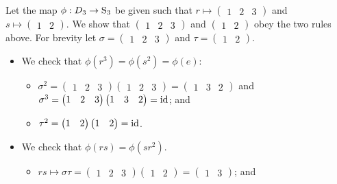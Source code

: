 \begin{enumerate}
    Let the map $\phi: D_3 \to \mathrm{S}_{3}$ be given such that $r \mapsto \begin{pmatrix}1 & 2 & 3\end{pmatrix}$ and $s \mapsto \begin{pmatrix}1 & 2\end{pmatrix}$. We show that $\begin{pmatrix}1 & 2 & 3\end{pmatrix}$ and $\begin{pmatrix}1 & 2\end{pmatrix}$ obey the two rules above. For brevity let $\sigma = \begin{pmatrix}1 & 2 & 3\end{pmatrix}$ and $\tau = \begin{pmatrix}1 & 2\end{pmatrix}$.
    \begin{itemize}
        \item We check that $\phi(r^3) = \phi(s^2) = \phi(e)$:
        \begin{itemize}
            \item $\sigma^2 = \begin{pmatrix}1 & 2 & 3\end{pmatrix}\begin{pmatrix}1 & 2 & 3\end{pmatrix} = \begin{pmatrix}1 & 3 & 2\end{pmatrix}$ and $\sigma^3 = \begin{pmatrix}1 & 2 & 3\end{pmatrix}\begin{pmatrix}1 & 3 & 2\end{pmatrix} = \mathrm{id}$; and
            \item $\tau^2 = \begin{pmatrix}1 & 2\end{pmatrix}\begin{pmatrix}1 & 2\end{pmatrix} = \mathrm{id}$.
        \end{itemize}
        \item We check that $\phi(rs) = \phi(sr^2)$.
        \begin{itemize}
            \item $rs \mapsto \sigma\tau = \begin{pmatrix}1 & 2 & 3\end{pmatrix}\begin{pmatrix}1 & 2\end{pmatrix} = \begin{pmatrix}1 & 3\end{pmatrix}$; and

\end{itemize}
\end{itemize}
\end{enumerate}
